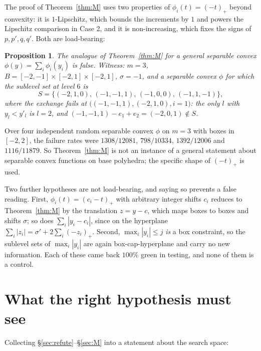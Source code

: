 \documentclass[11pt]{article}
\theoremstyle{plain}
\newtheorem{proposition}[theorem]{Proposition}
\theoremstyle{definition}
\newcommand{\pospart}[1]{\left(#1\right)_{+}}
\begin{document}
The proof of Theorem~\ref{thm:M} uses two properties of $\phi_i(t)=\pospart{-t}$ beyond
convexity: it is $1$-Lipschitz, which bounds the increments by $1$ and powers the
Lipschitz comparison in Case 2, and it is non-increasing, which fixes the signs of
$p,p',q,q'$. Both are load-bearing:

\begin{proposition}\label{prop:sharp}
The analogue of Theorem~\ref{thm:M} for a general separable convex
$\phi(y)=\sum_i\phi_i(y_i)$ is \emph{false}. Witness: $m=3$,
$B=[-2,-1]\times[-2,1]\times[-2,1]$, $\sigma=-1$, and a separable convex $\phi$ for which
the sublevel set at level $6$ is
\[
  S=\{(-2,1,0),\,(-1,-1,1),\,(-1,0,0),\,(-1,1,-1)\},
\]
where the exchange fails at $\bigl((-1,-1,1),(-2,1,0),i=1\bigr)$: the only $l$ with
$y_l<y'_l$ is $l=2$, and $(-1,-1,1)-e_1+e_2=(-2,0,1)\notin S$.
\end{proposition}

\noindent Over four independent random separable convex $\phi$ on $m=3$ with boxes in
$[-2,2]$, the failure rates were $1308/12081$, $798/10334$, $1392/12006$ and
$1116/11879$. So Theorem~\ref{thm:M} is not an instance of a general statement about
separable convex functions on base polyhedra; the specific shape of $\pospart{-t}$ is
used.

Two further hypotheses are not load-bearing, and saying so prevents a false reading.
First, $\phi_i(t)=(c_i-t)_+$ with arbitrary integer shifts $c_i$ reduces to
Theorem~\ref{thm:M} by the translation $z=y-c$, which maps boxes to boxes and shifts
$\sigma$; so does $\sum_i|y_i-c_i|$, since on the hyperplane
$\sum_i|z_i|=\sigma'+2\sum_i\pospart{-z_i}$. Second, $\max_i|y_i|\le j$ \emph{is} a box
constraint, so the sublevel sets of $\max_i|y_i|$ are again box-cap-hyperplane and carry
no new information. Each of these came back $100\%$ green in testing, and none of them is
a control.

\section{What the right hypothesis must see}\label{sec:what}

Collecting \S\ref{sec:refute}--\S\ref{sec:M} into a statement about the search space:
\end{document}
